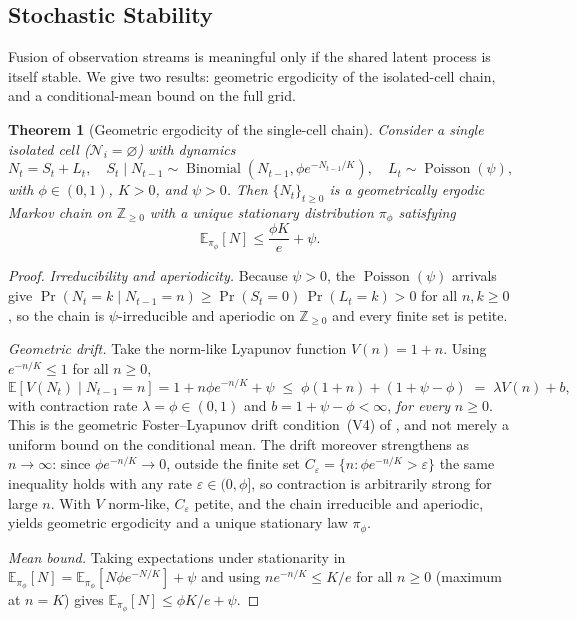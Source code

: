 \documentclass[preprint,12pt]{elsarticle}
\newtheorem{theorem}{Theorem}
\theoremstyle{definition}
\newcommand{\E}{\mathbb{E}}
\newcommand{\Pois}{\operatorname{Poisson}}
\newcommand{\Bin}{\operatorname{Binomial}}
\begin{document}
\subsection{Stochastic Stability}
\label{sec:stability}

Fusion of observation streams is meaningful only if the shared latent
process is itself stable. We give two results: geometric ergodicity of the
isolated-cell chain, and a conditional-mean bound on the full grid.

\begin{theorem}[Geometric ergodicity of the single-cell chain]
\label{thm:ergodic}
Consider a single isolated cell ($\mathcal{N}_i=\varnothing$) with dynamics
\[
  N_t=S_t+L_t,\quad
  S_t\mid N_{t-1}\sim\Bin\!\left(N_{t-1},\phi e^{-N_{t-1}/K}\right),
  \quad L_t\sim\Pois(\psi),
\]
with $\phi\in(0,1)$, $K>0$, and $\psi>0$. Then $\{N_t\}_{t\ge0}$ is a
geometrically ergodic Markov chain on $\mathbb{Z}_{\ge0}$ with a unique
stationary distribution $\pi_\phi$ satisfying
\[
  \E_{\pi_\phi}[N]\le \frac{\phi K}{e}+\psi .
\]
\end{theorem}

\begin{proof}
\emph{Irreducibility and aperiodicity.} Because $\psi>0$, the $\Pois(\psi)$
arrivals give $\Pr(N_t=k\mid N_{t-1}=n)\ge\Pr(S_t=0)\,\Pr(L_t=k)>0$ for all
$n,k\ge0$, so the chain is $\psi$-irreducible and aperiodic on
$\mathbb{Z}_{\ge0}$ and every finite set is petite.

\emph{Geometric drift.} Take the norm-like Lyapunov function $V(n)=1+n$.
Using $e^{-n/K}\le1$ for all $n\ge0$,
\[
  \E[V(N_t)\mid N_{t-1}=n]
  =1+n\phi e^{-n/K}+\psi
  \;\le\; \phi(1+n)+(1+\psi-\phi)
  \;=\;\lambda V(n)+b,
\]
with contraction rate $\lambda=\phi\in(0,1)$ and $b=1+\psi-\phi<\infty$,
\emph{for every} $n\ge0$. This is the geometric Foster--Lyapunov drift
condition~(V4) of \citet[Ch.~15]{meyntweedie2009}, and not merely a uniform
bound on the conditional mean. The drift moreover strengthens as
$n\to\infty$: since $\phi e^{-n/K}\to0$, outside the finite set
$C_\varepsilon=\{n:\phi e^{-n/K}>\varepsilon\}$ the same inequality holds with
any rate $\varepsilon\in(0,\phi]$, so contraction is arbitrarily strong for
large $n$. With $V$ norm-like, $C_\varepsilon$ petite, and the chain
irreducible and aperiodic, \citet[Thm.~15.0.1]{meyntweedie2009} yields
geometric ergodicity and a unique stationary law $\pi_\phi$.

\emph{Mean bound.} Taking expectations under stationarity in
$\E_{\pi_\phi}[N]=\E_{\pi_\phi}\!\left[N\phi e^{-N/K}\right]+\psi$ and using
$n e^{-n/K}\le K/e$ for all $n\ge0$ (maximum at $n=K$) gives
$\E_{\pi_\phi}[N]\le \phi K/e+\psi$.
\end{proof}
\end{document}
